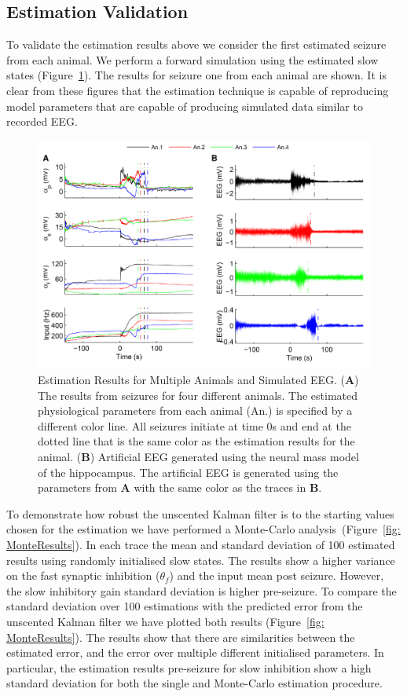 \subsection{Estimation Validation}

To validate the estimation results above we consider the first estimated seizure from each animal. We perform a forward simulation using the estimated slow states (Figure~\ref{fig: SZComp}). The results for seizure one from each animal are shown. It is clear from these figures that the estimation technique is capable of reproducing model parameters that are capable of producing simulated data similar to recorded EEG.  

\begin{figure}[ht]
 	\centering
 		\includegraphics{fig/AnimalComp.pdf}
 	\caption{Estimation Results for Multiple Animals and Simulated EEG. (\textbf{A}) The results from seizures for four different animals. The estimated physiological parameters from each animal (An.) is specified by a different color line. All seizures initiate at time 0s and end at the dotted line that is the same color as the estimation results for the animal. (\textbf{B}) Artificial EEG generated using the neural mass model of the hippocampus. The artificial EEG is generated using the parameters from \textbf{A} with the same color as the traces in \textbf{B}.}
 	\label{fig: SZComp}
 \end{figure}

To demonstrate how robust the unscented Kalman filter is to the starting values chosen for the estimation we have performed a Monte-Carlo analysis~(Figure~\ref{fig: MonteResults}). In each trace the mean and standard deviation of 100 estimated results using randomly initialised slow states. The results show a higher variance on the fast synaptic inhibition ($\theta_f$) and the input mean post seizure. However, the slow inhibitory gain standard deviation is higher pre-seizure. To compare the standard deviation over 100 estimations with the predicted error from the unscented Kalman filter we have plotted both results (Figure~\ref{fig: MonteResults}). The results show that there are similarities between the estimated error, and the error over multiple different initialised parameters. In particular, the estimation results pre-seizure for slow inhibition show a high standard deviation for both the single and Monte-Carlo estimation procedure.

